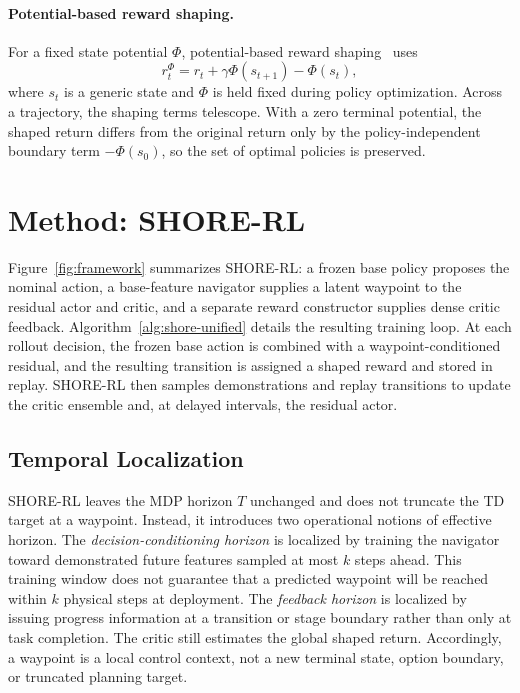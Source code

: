 \documentclass[letterpaper]{article} %
\begin{document}
\paragraph{Potential-based reward shaping.}
For a fixed state potential $\Phi$, potential-based reward
shaping~\cite{ng1999policy} uses
\begin{equation}
 r_t^\Phi=r_t+\gamma\Phi(s_{t+1})-\Phi(s_t),
\label{eq:pbs-background}
\end{equation}
where $s_t$ is a generic state and $\Phi$ is held fixed during policy
optimization. Across a trajectory, the shaping terms telescope. With a zero
terminal potential, the shaped return differs from the original return only
by the policy-independent boundary term $-\Phi(s_0)$, so the set of optimal
policies is preserved.

\section{Method: SHORE-RL}
Figure~\ref{fig:framework} summarizes SHORE-RL: a frozen base policy proposes
the nominal action, a base-feature navigator supplies a latent waypoint to
the residual actor and critic, and a separate reward constructor supplies
dense critic feedback. Algorithm~\ref{alg:shore-unified} details the resulting
training loop. At each rollout decision, the frozen base action is combined
with a waypoint-conditioned residual, and the resulting transition is assigned
a shaped reward and stored in replay. SHORE-RL then samples demonstrations and
replay transitions to update the critic ensemble and, at delayed intervals,
the residual actor.

\subsection{Temporal Localization}
SHORE-RL leaves the MDP horizon $T$ unchanged and does not truncate the TD
target at a waypoint. Instead, it introduces two operational notions of
effective horizon. The \emph{decision-conditioning horizon} is localized by
training the navigator toward demonstrated future features sampled at most
$k$ steps ahead. This training window does not guarantee that a predicted
waypoint will be reached within $k$ physical steps at deployment. The
\emph{feedback horizon} is localized by issuing progress information at a
transition or stage boundary rather than only at task completion. The critic
still estimates the global shaped return. Accordingly, a waypoint is a local
control context, not a new terminal state, option boundary, or truncated
planning target.
\end{document}
